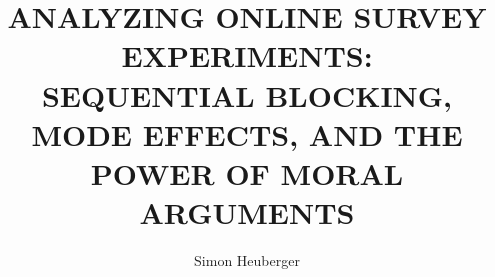 \documentclass[12pt,econ]{/Users/simonheuberger/Dropbox/work/latex/thesis/authesis}
\begin{document}
 
\title{ANALYZING ONLINE SURVEY EXPERIMENTS:\\ SEQUENTIAL BLOCKING, MODE EFFECTS, AND THE POWER OF MORAL ARGUMENTS}

\author{Simon Heuberger}


\maketitle
\end{document}
